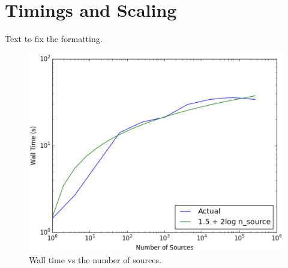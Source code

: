 
%

\section{Timings and Scaling}
\label{sec:timing}

Text to fix the formatting.

\begin{figure}
\includegraphics[width=\textwidth]{graphics/Timings.eps}
\caption[Wall time vs the number of sources.]{Wall time vs the number of sources.}
\label{fig:scaling}
\end{figure}

